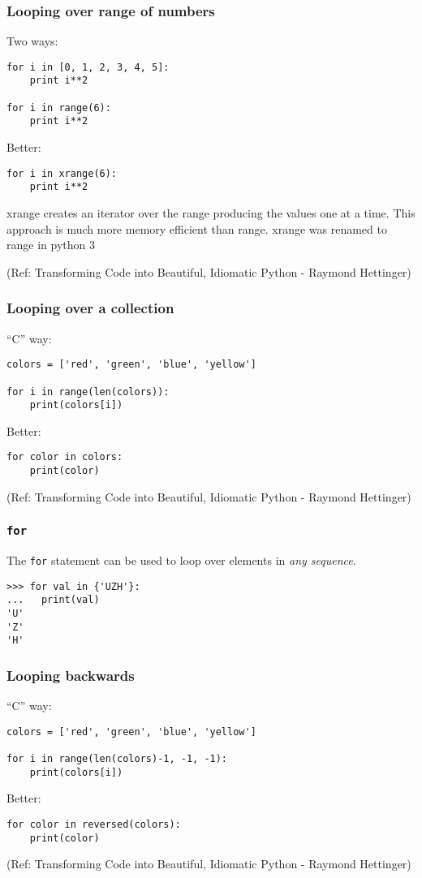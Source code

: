 \begin{frame}[fragile]\frametitle{Looping over range of numbers}
Two ways:
\begin{lstlisting}
for i in [0, 1, 2, 3, 4, 5]:
    print i**2

for i in range(6):
    print i**2
\end{lstlisting}
Better:
\begin{lstlisting}
for i in xrange(6):
    print i**2
\end{lstlisting}
xrange creates an iterator over the range producing the values one at a time. This approach is much more memory efficient than range. xrange was renamed to range in python 3

\tiny{(Ref: Transforming Code into Beautiful, Idiomatic Python -  Raymond Hettinger)}
\end{frame}

\begin{frame}[fragile]\frametitle{Looping over a collection}
``C'' way:
\begin{lstlisting}
colors = ['red', 'green', 'blue', 'yellow']

for i in range(len(colors)):
    print(colors[i])
\end{lstlisting}
Better:
\begin{lstlisting}
for color in colors:
    print(color)
\end{lstlisting}

\tiny{(Ref: Transforming Code into Beautiful, Idiomatic Python -  Raymond Hettinger)}
\end{frame}

\begin{frame}[fragile]\frametitle{\texttt{for}}
  The \texttt{for} statement can be used to loop over elements in \emph{any sequence}.

\begin{lstlisting}
>>> for val in {'UZH'}:
...   print(val)
'U'
'Z'
'H'
\end{lstlisting}

\end{frame}

\begin{frame}[fragile]\frametitle{Looping backwards}
``C'' way:
\begin{lstlisting}
colors = ['red', 'green', 'blue', 'yellow']

for i in range(len(colors)-1, -1, -1):
    print(colors[i])
\end{lstlisting}
Better:
\begin{lstlisting}
for color in reversed(colors):
    print(color)
\end{lstlisting}

\tiny{(Ref: Transforming Code into Beautiful, Idiomatic Python -  Raymond Hettinger)}
\end{frame}






